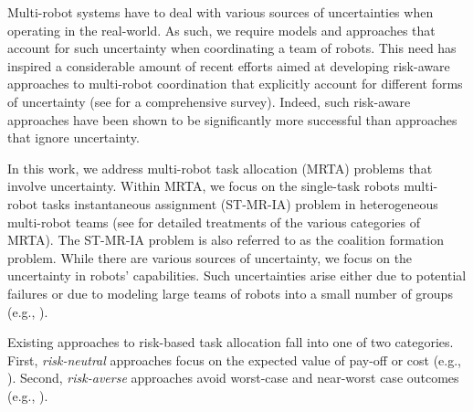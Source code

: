 \documentclass[letterpaper, 10 pt, conference]{ieeeconf}  %
\begin{document}


Multi-robot systems have to deal with various sources of uncertainties when operating in the real-world. As such, we require models and approaches that account for such uncertainty when coordinating a team of robots. This need has inspired a considerable amount of recent efforts aimed at developing risk-aware approaches to multi-robot coordination that explicitly account for different forms of uncertainty (see \cite{zhou_multi-robot_2021} for a comprehensive survey). Indeed, such risk-aware approaches have been shown to be significantly more successful than approaches that ignore uncertainty.

In this work, we address multi-robot task allocation (MRTA) problems that involve uncertainty. Within MRTA, we focus on the single-task robots multi-robot tasks instantaneous assignment (ST-MR-IA) problem in heterogeneous multi-robot teams (see \cite{gerkey2004,korsah2013comprehensive} for detailed treatments of the various categories of MRTA). The ST-MR-IA problem is also referred to as the coalition formation problem. While there are various sources of uncertainty, we focus on the uncertainty in robots' capabilities. Such uncertainties arise either due to potential failures or due to modeling large teams of robots into a small number of groups (e.g., \cite{prorok2017impact,ravichandar2020}).

Existing approaches to risk-based task allocation fall into one of two categories. First, \textit{risk-neutral} approaches focus on the expected value of pay-off or cost (e.g., \cite{prorok_redundant_2019,choudhury2020dynamic}). Second, \textit{risk-averse} approaches avoid worst-case and near-worst case outcomes (e.g., \cite{nam_analyzing_2017,ravichandar2020}).
\end{document}
